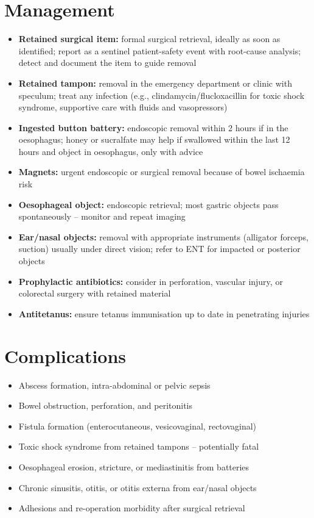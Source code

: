 \section*{Management}
\begin{itemize}
    \item \textbf{Retained surgical item:} formal surgical retrieval, ideally as soon as identified; report as a sentinel patient-safety event with root-cause analysis; detect and document the item to guide removal
    \item \textbf{Retained tampon:} removal in the emergency department or clinic with speculum; treat any infection (e.g., clindamycin/flucloxacillin for toxic shock syndrome, supportive care with fluids and vasopressors)
    \item \textbf{Ingested button battery:} endoscopic removal within 2 hours if in the oesophagus; honey or sucralfate may help if swallowed within the last 12 hours and object in oesophagus, only with advice
    \item \textbf{Magnets:} urgent endoscopic or surgical removal because of bowel ischaemia risk
    \item \textbf{Oesophageal object:} endoscopic retrieval; most gastric objects pass spontaneously -- monitor and repeat imaging
    \item \textbf{Ear/nasal objects:} removal with appropriate instruments (alligator forceps, suction) usually under direct vision; refer to ENT for impacted or posterior objects
    \item \textbf{Prophylactic antibiotics:} consider in perforation, vascular injury, or colorectal surgery with retained material
    \item \textbf{Antitetanus:} ensure tetanus immunisation up to date in penetrating injuries
\end{itemize}

\section*{Complications}
\begin{itemize}
    \item Abscess formation, intra-abdominal or pelvic sepsis
    \item Bowel obstruction, perforation, and peritonitis
    \item Fistula formation (enterocutaneous, vesicovaginal, rectovaginal)
    \item Toxic shock syndrome from retained tampons -- potentially fatal
    \item Oesophageal erosion, stricture, or mediastinitis from batteries
    \item Chronic sinusitis, otitis, or otitis externa from ear/nasal objects
    \item Adhesions and re-operation morbidity after surgical retrieval
\end{itemize}

